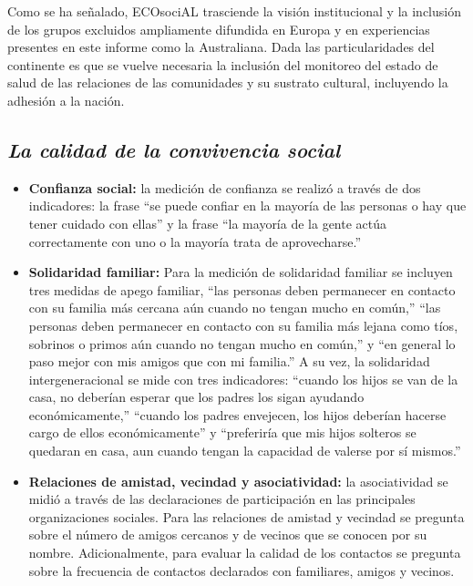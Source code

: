 \documentclass[
  12pt,
]{book}
\begin{document}
Como se ha señalado, ECOsociAL trasciende la visión institucional y la inclusión de los grupos excluidos ampliamente difundida en Europa y en experiencias presentes en este informe como la Australiana. Dada las particularidades del continente es que se vuelve necesaria la inclusión del monitoreo del estado de salud de las relaciones de las comunidades y su sustrato cultural, incluyendo la adhesión a la nación.

\hypertarget{la-calidad-de-la-convivencia-social}{%
\subsection{\texorpdfstring{\emph{La calidad de la convivencia social}}{La calidad de la convivencia social}}\label{la-calidad-de-la-convivencia-social}}

\begin{itemize}
\item
  \textbf{Confianza social:} la medición de confianza se realizó a través de dos indicadores: la frase ``se puede confiar en la mayoría de las personas o hay que tener cuidado con ellas'' y la frase ``la mayoría de la gente actúa correctamente con uno o la mayoría trata de aprovecharse.''
\item
  \textbf{Solidaridad familiar:} Para la medición de solidaridad familiar se incluyen tres medidas de apego familiar, ``las personas deben permanecer en contacto con su familia más cercana aún cuando no tengan mucho en común,'' ``las personas deben permanecer en contacto con su familia más lejana como tíos, sobrinos o primos aún cuando no tengan mucho en común,'' y ``en general lo paso mejor con mis amigos que con mi familia.'' A su vez, la solidaridad intergeneracional se mide con tres indicadores: ``cuando los hijos se van de la casa, no deberían esperar que los padres los sigan ayudando económicamente,'' ``cuando los padres envejecen, los hijos deberían hacerse cargo de ellos económicamente'' y ``preferiría que mis hijos solteros se quedaran en casa, aun cuando tengan la capacidad de valerse por sí mismos.''
\item
  \textbf{Relaciones de amistad, vecindad y asociatividad:} la asociatividad se midió a través de las declaraciones de participación en las principales organizaciones sociales. Para las relaciones de amistad y vecindad se pregunta sobre el número de amigos cercanos y de vecinos que se conocen por su nombre. Adicionalmente, para evaluar la calidad de los contactos se pregunta sobre la frecuencia de contactos declarados con familiares, amigos y vecinos.

\end{itemize}
\end{document}
